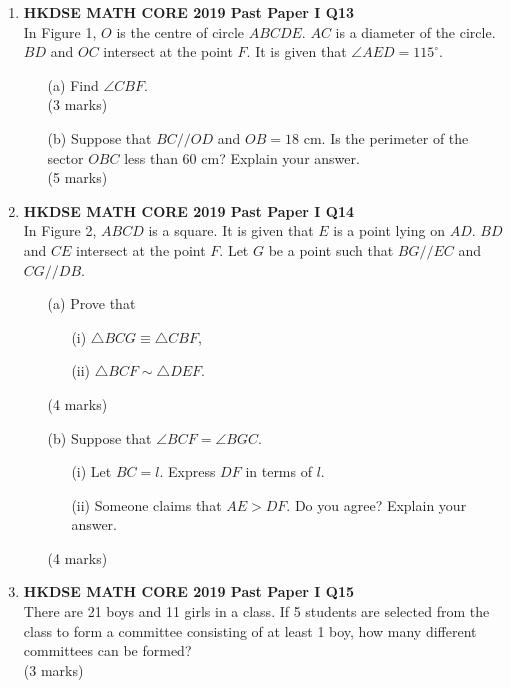 \documentclass[12pt]{article}
\begin{document}
\begin{enumerate}
	\item \textbf{HKDSE MATH CORE 2019 Past Paper I Q13}\\
	In Figure 1, $O$ is the centre of circle $ABCDE$. $AC$ is a diameter of the circle. $BD$ and $OC$ intersect at the point $F$. It is given that $\angle AED = 115^\circ$.
	\begin{enumerate}
		\item[(a)] Find $\angle CBF$. \\(3 marks)
		\item[(b)] Suppose that $BC//OD$ and $OB = 18$ cm. Is the perimeter of the sector $OBC$ less than 60 cm? Explain your answer. \\(5 marks)
	\end{enumerate}

	\item \textbf{HKDSE MATH CORE 2019 Past Paper I Q14}\\
	In Figure 2, $ABCD$ is a square. It is given that $E$ is a point lying on $AD$. $BD$ and $CE$ intersect at the point $F$. Let $G$ be a point such that $BG // EC$ and $CG // DB$.
	\begin{enumerate}
		\item [(a)] Prove that 
		\begin{enumerate}
			\item[(i)] $\triangle BCG \equiv \triangle CBF$,
			\item[(ii)] $\triangle BCF \sim \triangle DEF$.
		\end{enumerate}
		(4 marks)
		\item[(b)] Suppose that $\angle BCF = \angle BGC$.
		\begin{enumerate}
			\item [(i)] Let $BC = l$. Express $DF$ in terms of $l$.
			\item[(ii)] Someone claims that $AE > DF$. Do you agree? Explain your answer.
		\end{enumerate}
		(4 marks)
	\end{enumerate}

	\item \textbf{HKDSE MATH CORE 2019 Past Paper I Q15}\\
	There are 21 boys and 11 girls in a class. If 5 students are selected from the class to form a committee consisting of at least 1 boy, how many different committees can be formed?	 \\(3 marks)


\end{enumerate}
\end{document}
